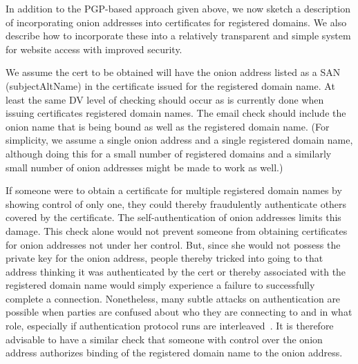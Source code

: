 \documentclass[10pt, conference, compsocconf]{styles/IEEEtran}
\begin{document}



In addition to the PGP-based approach given above,
we now sketch a description of incorporating onion addresses into
certificates for registered domains. We also describe how to
incorporate these into a relatively transparent and simple system for
website access with improved security. 


We assume the cert to be obtained will have the onion address listed
as a SAN (subjectAltName) in the certificate issued for the registered
domain name.  At least the same DV level of checking should occur as
is currently done when issuing certificates registered domain
names. The email check should include the onion name that is being
bound as well as the registered domain name.  (For simplicity, we
assume a single onion address and a single registered domain name,
although doing this for a small number of registered domains and a
similarly small number of onion addresses might be made to work as
well.)


If someone were to obtain a certificate for multiple registered domain
names by showing control of only one, they could thereby fraudulently
authenticate others covered by the certificate. The
self-authentication of onion addresses limits this damage.  This check
alone would not prevent someone from obtaining certificates for onion
addresses not under her control. But, since she would not possess the
private key for the onion address, people thereby tricked into going
to that address thinking it was authenticated by the cert or thereby
associated with the registered domain name would simply experience a
failure to successfully complete a connection. Nonetheless, many
subtle attacks on authentication are possible when parties are
confused about who they are connecting to and in what role, especially
if authentication protocol runs are interleaved~\cite{fosad00}.  It is
therefore advisable to have a similar check that someone with control
over the onion address authorizes binding of the registered domain
name to the onion address.
\end{document}
